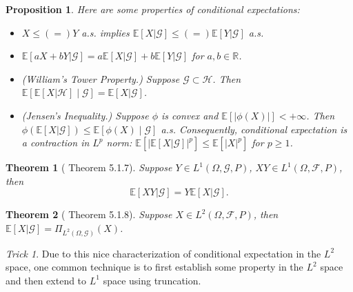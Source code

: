 \documentclass[openany]{book}
\newtheorem{proposition}{Proposition}[chapter]
\newtheorem{theorem}{Theorem}[chapter]
\theoremstyle{definition}
\theoremstyle{remark}
\newtheorem*{trick}{Trick}
\begin{document}
\begin{proposition}
    Here are some properties of conditional expectations:
    \begin{itemize}
        \item $X\le(=)Y$ a.s. implies $\mathbb{E}[X|\mathcal{G}]\le(=)\mathbb{E}[Y|\mathcal{G}]$ a.s.
        \item $\mathbb{E}[aX+bY|\mathcal{G}]=a \mathbb{E}[X|\mathcal{G}]+b \mathbb{E}[Y|\mathcal{G}]$ for $a,b\in \mathbb{R}$.
        \item (William's Tower Property.) Suppose $\mathcal{G}\subset \mathcal{H}$. Then $\mathbb{E}\left[\mathbb{E}[X|\mathcal{H}]\middle|\mathcal{G}\right]=\mathbb{E}[X|\mathcal{G}]$.
        \item (Jensen's Inequality.) Suppose $\phi$ is convex and $\mathbb{E}\left[|\phi(X)|\right]<+\infty$. Then $\phi\left(\mathbb{E}[X|\mathcal{G}]\right)\le \mathbb{E}\left[\phi(X)\middle|\mathcal{G}\right]$ a.s. Consequently, conditional expectation is a contraction in $L^p$ norm: $\mathbb{E}\left[\left|\mathbb{E}[X|\mathcal{G}]\right|^p\right]\le \mathbb{E}\left[|X|^p\right]$ for $p\ge1$.
    \end{itemize}
\end{proposition}
\begin{theorem}[\cite{D10} Theorem 5.1.7]
    Suppose $Y\in L^1(\Omega,\mathcal{G},P)$, $XY\in L^1(\Omega,\mathcal{F},P)$, then
    \begin{equation*}
        \mathbb{E}[XY|\mathcal{G}]=Y \mathbb{E}[X|\mathcal{G}].
    \end{equation*}
\end{theorem}
\begin{theorem}[\cite{D10} Theorem 5.1.8]
    Suppose $X\in L^2(\Omega,\mathcal{F},P)$, then $\mathbb{E}[X|\mathcal{G}]=\Pi_{L^2(\Omega,\mathcal{G})}(X)$.
\end{theorem}
\begin{trick}
    Due to this nice characterization of conditional expectation in the $L^2$ space, one common technique is to first establish some property in the $L^2$ space and then extend to $L^1$ space using truncation.
\end{trick}
\end{document}

